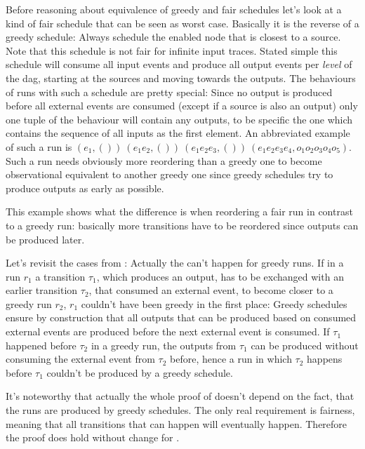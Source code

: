   Before reasoning about equivalence of greedy and fair schedules let's look at a kind of fair schedule that can be seen as worst case.
  Basically it is the reverse of a greedy schedule: Always schedule the enabled node that is closest to a source.
  Note that this schedule is not fair for infinite input traces.
  Stated simple this schedule will consume all input events and produce all output events per \emph{level} of the \gls{dag}, starting at the sources and moving towards the outputs.
  The behaviours of runs with such a schedule are pretty special: Since no output is produced before all external events are consumed (except if a source is also an output) only one tuple of the behaviour will contain any outputs, to be specific the one which contains the sequence of all inputs as the first element.
  An abbreviated example of such a run is \((e_1,())\ (e_1e_2,())\ (e_1e_2e_3,())\ (e_1e_2e_3e_4,o_1o_2o_3o_4o_5)\).
  Such a run needs obviously more reordering than a greedy one to become observational equivalent to another greedy one since greedy schedules try to produce outputs as early as possible.

  This example shows what the difference is when reordering a fair run in contrast to a greedy run: basically more transitions have to be reordered since outputs can be produced later.

  Let's revisit the cases from :
  Actually the  can't happen for greedy runs.
  If in a run \(r_1\) a transition \(\tau_1\), which produces an output, has to be exchanged with an earlier transition \(\tau_2\), that consumed an external event, to become closer to a greedy run \(r_2\), \(r_1\) couldn't have been greedy in the first place:
  Greedy schedules ensure by construction that all outputs that can be produced based on consumed external events are produced before the next external event is consumed.
  If \(\tau_1\) happened before \(\tau_2\) in a greedy run, the outputs from \(\tau_1\) can be produced without consuming the external event from \(\tau_2\) before, hence a run in which \(\tau_2\) happens before \(\tau_1\) couldn't be produced by a greedy schedule.

  It's noteworthy that actually the whole proof of  doesn't depend on the fact, that the runs are produced by greedy schedules.
  The only real requirement is fairness, meaning that all transitions that can happen will eventually happen.
  Therefore the proof does hold without change for .

